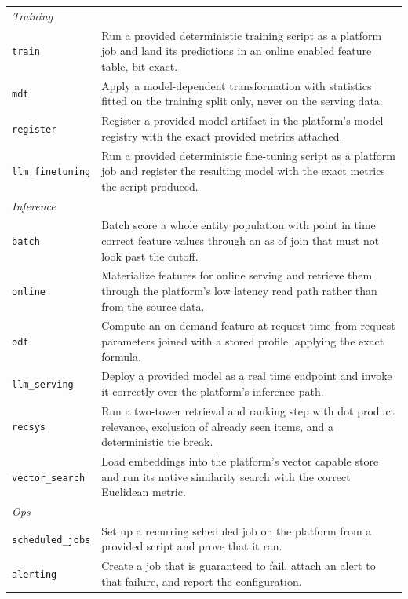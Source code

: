 \documentclass[
english,                 %
bibtex,                  %
]{kththesis}
\numberwithin{listing}{chapter}
\begin{document}
{\begin{longtable}{@{}lp{\dimexpr\textwidth-4.8cm\relax}@{}}
        \midrule
        \multicolumn{2}{l}{\textit{Training}} \\
        \texttt{train} & Run a provided deterministic training script as a platform job and land its predictions in an online enabled feature table, bit exact. \\
        \texttt{mdt} & Apply a model-dependent transformation with statistics fitted on the training split only, never on the serving data. \\
        \texttt{register} & Register a provided model artifact in the platform's model registry with the exact provided metrics attached. \\
        \texttt{llm\_finetuning} & Run a provided deterministic fine-tuning script as a platform job and register the resulting model with the exact metrics the script produced. \\
        \midrule
        \multicolumn{2}{l}{\textit{Inference}} \\
        \texttt{batch} & Batch score a whole entity population with point in time correct feature values through an as of join that must not look past the cutoff. \\
        \texttt{online} & Materialize features for online serving and retrieve them through the platform's low latency read path rather than from the source data. \\
        \texttt{odt} & Compute an on-demand feature at request time from request parameters joined with a stored profile, applying the exact formula. \\
        \texttt{llm\_serving} & Deploy a provided model as a real time endpoint and invoke it correctly over the platform's inference path. \\
        \texttt{recsys} & Run a two-tower retrieval and ranking step with dot product relevance, exclusion of already seen items, and a deterministic tie break. \\
        \texttt{vector\_search} & Load embeddings into the platform's vector capable store and run its native similarity search with the correct Euclidean metric. \\
        \midrule
        \multicolumn{2}{l}{\textit{Ops}} \\
        \texttt{scheduled\_jobs} & Set up a recurring scheduled job on the platform from a provided script and prove that it ran. \\
        \texttt{alerting} & Create a job that is guaranteed to fail, attach an alert to that failure, and report the configuration. \\

\end{longtable}}
\end{document}
